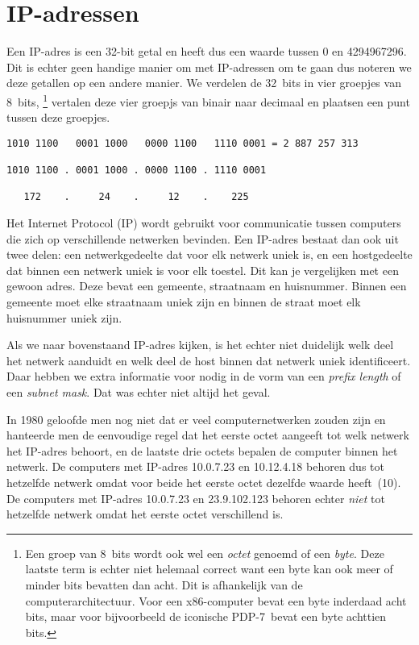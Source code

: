 \chapter{IP-adressen}

Een IP-adres is een 32-bit getal en heeft dus een waarde tussen 0 en \num{4294967296}.
Dit is echter geen handige manier om met IP-adressen om te gaan dus noteren we deze getallen op een andere manier.
We verdelen de 32~bits in vier groepjes van 8~bits,%
   \footnote{%
      Een groep van 8~bits wordt ook wel een \emph{octet} genoemd of een \emph{byte}.
      Deze laatste term is echter niet helemaal correct want een byte kan ook meer of minder bits bevatten dan acht.
      Dit is afhankelijk van de computerarchitectuur.
      Voor een x86-computer bevat een byte inderdaad acht bits, maar voor bijvoorbeeld de iconische PDP-7\footnotemark\ 
      bevat een byte achttien bits.
   }%
vertalen deze vier groepjs van binair naar decimaal en plaatsen een punt tussen deze groepjes.

\begin{verbatim}
1010 1100   0001 1000   0000 1100   1110 0001 = 2 887 257 313

1010 1100 . 0001 1000 . 0000 1100 . 1110 0001

   172    .     24    .     12    .    225
\end{verbatim}

Het Internet Protocol (IP) wordt gebruikt voor communicatie tussen computers die zich op verschillende netwerken bevinden.
Een IP-adres bestaat dan ook uit twee delen: een netwerkgedeelte dat voor elk netwerk uniek is, en een hostgedeelte dat binnen een netwerk uniek is voor elk toestel.
Dit kan je vergelijken met een gewoon adres.
Deze bevat een gemeente, straatnaam en huisnummer.
Binnen een gemeente moet elke straatnaam uniek zijn en binnen de straat moet elk huisnummer uniek zijn.

Als we naar bovenstaand IP-adres kijken, is het echter niet duidelijk welk deel het netwerk aanduidt en welk deel de host binnen dat netwerk uniek identificeert.
Daar hebben we extra informatie voor nodig in de vorm van een \emph{prefix length} of een \emph{subnet mask}.
Dat was echter niet altijd het geval.

In 1980 geloofde men nog niet dat er veel computernetwerken zouden zijn en hanteerde men de eenvoudige regel dat het eerste octet aangeeft tot welk netwerk het IP-adres behoort, en de laatste drie octets bepalen de computer binnen het netwerk.
De computers met IP-adres 10.0.7.23 en 10.12.4.18 behoren dus tot hetzelfde netwerk omdat voor beide het eerste octet dezelfde waarde heeft~(10).
De computers met IP-adres 10.0.7.23 en 23.9.102.123 behoren echter \emph{niet} tot hetzelfde netwerk omdat het eerste octet verschillend is.

